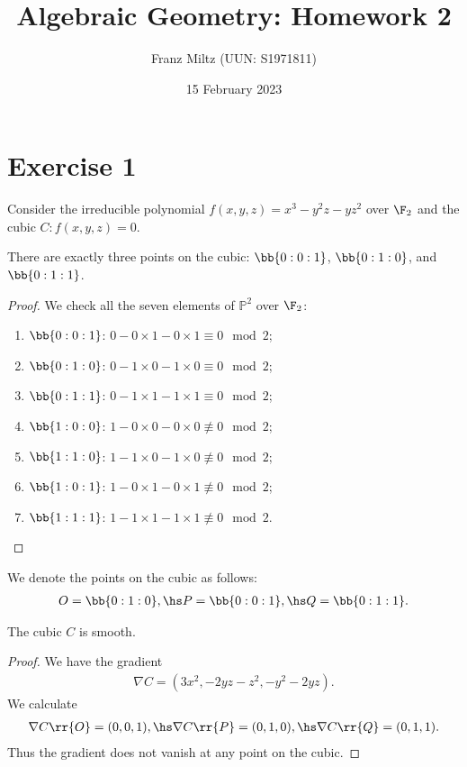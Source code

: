 \documentclass{article}
\begin{document}
\title{Algebraic Geometry: Homework 2}
\author{Franz Miltz (UUN: S1971811)}
\date{15 February 2023}
\maketitle

\section*{Exercise 1}

Consider the irreducible polynomial $f(x,y,z)=x^3-y^2z-yz^2$ over $\F_2$ and
the cubic $C:f(x,y,z)=0$.

\begin{claim*}[1]
  There are exactly three points on the cubic: $\bb{0:0:1}$, $\bb{0:1:0}$, and $\bb{0:1:1}$.
  \begin{proof}
    We check all the seven elements of $\mathbb P^2$ over $\F_2$:
    \begin{enumerate}
      \item $\bb{0:0:1}$: $0-0\times 1-0\times 1\equiv 0 \mod 2$;
      \item $\bb{0:1:0}$: $0-1\times 0-1\times 0\equiv 0 \mod 2$;
      \item $\bb{0:1:1}$: $0-1\times 1-1\times 1\equiv 0 \mod 2$;
      \item $\bb{1:0:0}$: $1-0\times 0-0\times 0\not\equiv 0 \mod 2$;
      \item $\bb{1:1:0}$: $1-1\times 0-1\times 0\not\equiv 0 \mod 2$;
      \item $\bb{1:0:1}$: $1-0\times 1-0\times 1\not\equiv 0 \mod 2$;
      \item $\bb{1:1:1}$: $1-1\times 1-1\times 1\not\equiv 0 \mod 2$.
    \end{enumerate}
  \end{proof}
\end{claim*}

We denote the points on the cubic as follows:
\begin{align*}
  O=\bb{0:1:0}, \hs P=\bb{0:0:1}, \hs Q=\bb{0:1:1}.
\end{align*}

\begin{claim*}[2]
  The cubic $C$ is smooth.
  \begin{proof}
    We have the gradient
    \begin{align*}
      \nabla C = (3x^2, -2yz - z^2, -y^2 -2yz).
    \end{align*}
    We calculate
    \begin{align*}
      \nabla C\rr{O} = (0,0,1), \hs
      \nabla C\rr{P} = (0,1,0), \hs
      \nabla C\rr{Q} = (0,1,1).
    \end{align*}
    Thus the gradient does not vanish at any point on the cubic.
  \end{proof}
\end{claim*}
\end{document}
